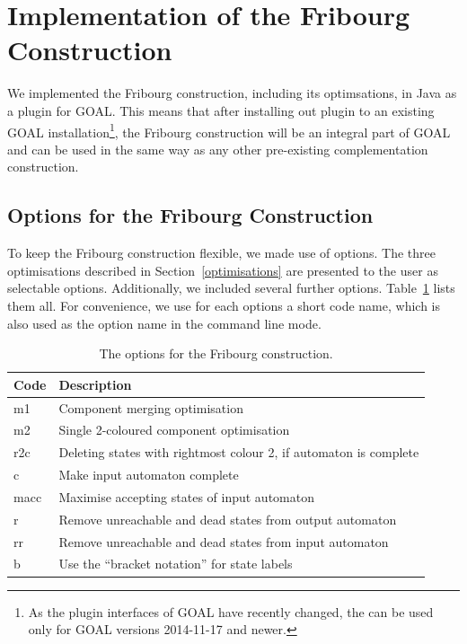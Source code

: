 \section{Implementation of the Fribourg Construction}
\label{implementation}
We implemented the Fribourg construction, including its optimsations, in Java as a plugin for GOAL. This means that after installing out plugin to an existing GOAL installation\footnote{As the plugin interfaces of GOAL have recently changed, the can be used only for GOAL versions 2014-11-17 and newer.}, the Fribourg construction will be an integral part of GOAL and can be used in the same way as any other pre-existing complementation construction.

\subsection{Options for the Fribourg Construction}
To keep the Fribourg construction flexible, we made use of options. The three optimisations described in Section~\ref{optimisations} are presented to the user as selectable options. Additionally, we included several further options. Table~\ref{goal_fribourg_options} lists them all. For convenience, we use for each options a short code name, which is also used as the option name in the command line mode.

\begin{table}
\caption{The options for the Fribourg construction.}
\begin{center}
\begin{tabular}{|l|l|}
\hline
Code & Description \\ \hline
m1 & Component merging optimisation \\ \hline
m2 & Single 2-coloured component optimisation \\ \hline
r2c & Deleting states with rightmost colour 2, if automaton is complete \\ \hline
c & Make input automaton complete \\ \hline
macc & Maximise accepting states of input automaton \\ \hline
r & Remove unreachable and dead states from output automaton \\ \hline
rr & Remove unreachable and dead states from input automaton \\ \hline
b & Use the ``bracket notation'' for state labels \\ \hline
\end{tabular}
\end{center}
\label{goal_fribourg_options}
\end{table}

